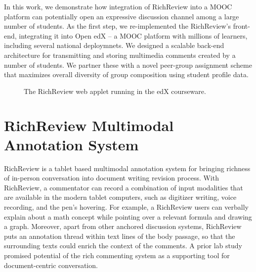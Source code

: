 \documentclass{sigchi}
\begin{document}
In this work, we demonstrate how integration of RichReview into a MOOC platform can potentially open an expressive discussion channel among a large number of students.
As the first step, we re-implemented the RichReview's front-end, integrating it into Open edX -- a MOOC platform with millions of learners, including several national deploymnets. We designed a scalable back-end architecture for transmitting and storing multimedia comments created by a number of students.
We partner these with a novel peer-group assignment scheme that maximizes overall diversity of group composition using student profile data.

\begin{figure}[!h]
\centering
{
\setlength{\fboxsep}{0pt}
\setlength{\fboxrule}{0.5pt}
}
\caption{The RichReview web applet running in the edX courseware.}
\label{fig:figure1}
\end{figure}


\section{RichReview Multimodal Annotation System}
RichReview is a tablet based multimodal annotation system for bringing richness of in-person conversation into document writing revision process.
With RichReview, a commentator can record a combination of input modalities that are available in the modern tablet computers, such as digitizer writing, voice recording, and the pen's hovering.
For example, a RichReview users can verbally explain about a math concept while pointing over a relevant formula and drawing a graph.
Moreover, apart from other anchored discussion systems, RichReview puts an annotation thread within text lines of the body passage, so that the surrounding texts could enrich the context of the comments.
A prior lab study promised potential of the rich commenting system as a supporting tool for document-centric conversation.
\end{document}
